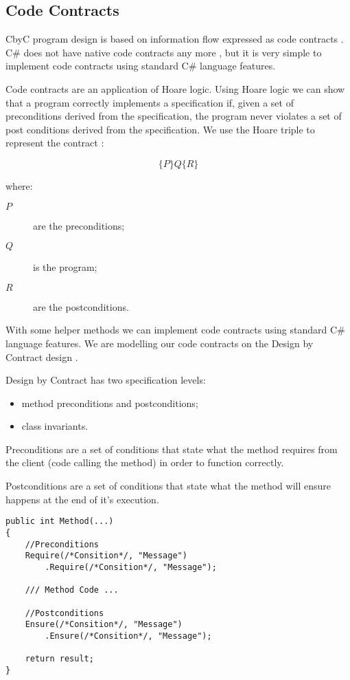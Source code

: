 \subsection{Code Contracts}

CbyC program design is based on information flow expressed as code contracts 
\parencite{CbyCMan}. C\# does not have native code contracts any more \parencite{NoCodeContracts},
but it is very simple to implement code contracts using standard C\# language features.

Code contracts are an application of Hoare logic. Using Hoare logic
we can show that a program correctly implements a specification if, given a set of 
preconditions derived from the specification, the program never violates a set of
post conditions derived from the specification. We use the Hoare triple to 
represent the contract \parencite{BasisForProgramming}:

\[
	\{P\}Q\{R\}
\]

where:
\begin{description}
	\item [$P$] are the preconditions;
	\item [$Q$] is the program;
	\item [$R$] are the postconditions.
\end{description}

With some helper methods we can implement code contracts using standard C\# language
features. We are modelling our code contracts on the Design by Contract design 
\parencite{ObjectOrientedSoftwareConstruction}.

Design by Contract has two specification levels:
\begin{itemize}
	\item method preconditions and postconditions;
	\item class invariants.
\end{itemize}

Preconditions are a set of conditions that state what the method requires from 
the client (code calling the method) in order to function correctly.

Postconditions are a set of conditions that state what the method will ensure 
happens at the end of it's execution.

\begin{lstlisting}[frame=single]
public int Method(...)
{
    //Preconditions
    Require(/*Consition*/, "Message")
        .Require(/*Consition*/, "Message");
        
    /// Method Code ...
    
    //Postconditions
    Ensure(/*Consition*/, "Message")
        .Ensure(/*Consition*/, "Message");

    return result;
}
\end{lstlisting}


